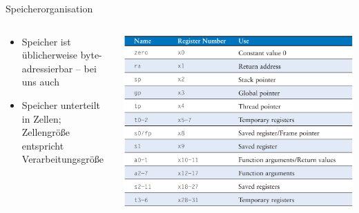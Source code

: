 \documentclass[
  german,            %
  aspectratio=169,    %
]{tumbeamer}
\begin{document}
\begin{frame}[c]{Speicherorganisation}{}
  \begin{columns}[c]
    \begin{column}{0.5\textwidth}
      \begin{itemize}
          \item Speicher ist üblicherweise byte-adressierbar -- bei uns auch
          \item Speicher unterteilt in Zellen; Zellengröße entspricht Verarbeitungsgröße
      \end{itemize}
    \end{column}
    \begin{column}{0.5\textwidth}
      \includegraphics[width=\linewidth]{riscv_registers.png}
    \end{column}
  \end{columns}
\end{frame}
\end{document}
